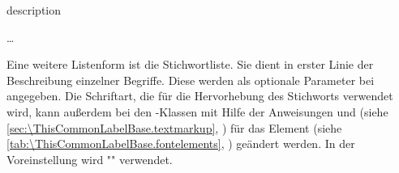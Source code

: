   \begin{Declaration}
    \begin{Environment}{description}
      \begin{Body}
         \dots
        \BodyDots
      \end{Body}
    \end{Environment}
  \end{Declaration}%
  Eine weitere
  Listenform ist die Stichwortliste. Sie dient in
  erster Linie der Beschreibung einzelner Begriffe. Diese werden als optionale
  Parameter bei  angegeben. %
  Die Schriftart, die für die Hervorhebung des
  Stichworts verwendet wird, kann außerdem bei den \KOMAScript-Klassen mit
  Hilfe der Anweisungen  und
   (siehe
  \autoref{sec:\ThisCommonLabelBase.textmarkup},
  ) für das Element
  (siehe \autoref{tab:\ThisCommonLabelBase.fontelements},
  ) geändert werden. In der
  Voreinstellung wird
  ""%
   verwendet.%
